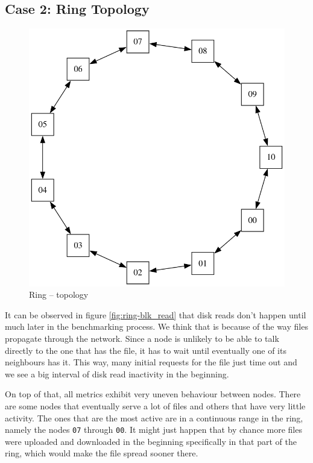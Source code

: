 



\newpage
\subsection{Case 2: Ring Topology}

\begin{figure}
\centering
\captionsetup{justification=centering,width=0.6\linewidth}
\includegraphics[width=0.8\linewidth]{figures/topologies/ring.png}
\caption{Ring -- topology}
\label{fig:ring-topology}

\end{figure}
It can be observed in figure \ref{fig:ring-blk_read} that disk reads don't
happen until much later in the benchmarking process. We think that is because
of the way files propagate through the network. Since a node is unlikely to be
able to talk directly to the one that has the file, it has to wait until
eventually one of its neighbours has it. This way, many initial requests for
the file just time out and we see a big interval of disk read inactivity in the
beginning.

On top of that, all metrics exhibit very uneven behaviour between nodes. There
are some nodes that eventually serve a lot of files and others that have very
little activity. The ones that are the most active are in a continuous range in
the ring, namely the nodes \verb|07| through \verb|00|. It might just happen
that by chance more files were uploaded and downloaded in the beginning
specifically in that part of the ring, which would make the file spread sooner
there.

